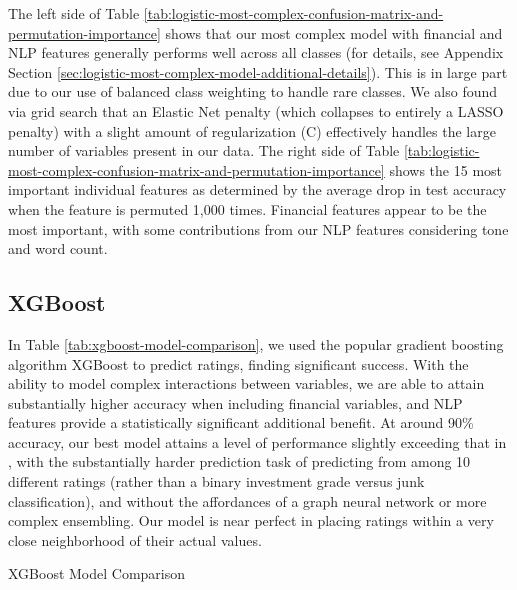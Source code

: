 \documentclass{article}[11pt]
\begin{document}
    The left side of Table \ref{tab:logistic-most-complex-confusion-matrix-and-permutation-importance} shows that our most complex model with financial and NLP features generally performs well across all classes (for details, see Appendix Section \ref{sec:logistic-most-complex-model-additional-details}). This is in large part due to our use of balanced class weighting to handle rare classes. We also found via grid search that an Elastic Net penalty (which collapses to entirely a LASSO penalty) with a slight amount of regularization (C) effectively handles the large number of variables present in our data. The right side of Table \ref{tab:logistic-most-complex-confusion-matrix-and-permutation-importance} shows the 15 most important individual features as determined by the average drop in test accuracy when the feature is permuted 1,000 times. Financial features appear to be the most important, with some contributions from our NLP features considering tone and word count.

    \subsection*{XGBoost}

    In Table \ref{tab:xgboost-model-comparison}, we used the popular gradient boosting algorithm XGBoost to predict ratings, finding significant success. With the ability to model complex interactions between variables, we are able to attain substantially higher accuracy when including financial variables, and NLP features provide a statistically significant additional benefit. At around 90\% accuracy, our best model attains a level of performance slightly exceeding that in \cite{das_credit_2023}, with the substantially harder prediction task of predicting from among 10 different ratings (rather than a binary investment grade versus junk classification), and without the affordances of a graph neural network or more complex ensembling. Our model is near perfect in placing ratings within a very close neighborhood of their actual values.

    \begin{table}[h!]
        \centering
        \caption{XGBoost Model Comparison}
        
        \label{tab:xgboost-model-comparison}
    \end{table}
\end{document}
